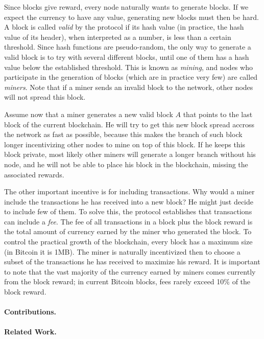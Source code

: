 Since blocks give reward, every node naturally wants to generate blocks. If we expect the currency to have any value, generating new blocks must then be hard. A block is called \emph{valid} by the protocol if its hash value (in practice, the hash value of its header), when interpreted as a number, is less than a certain threshold. Since hash functions are pseudo-random, the only way to generate a valid block is to try with several different blocks, until one of them has a hash value below the established threshold. This is known as \emph{mining}, and nodes who participate in the generation of blocks (which are in practice very few) are called \emph{miners}. Note that if a miner sends an invalid block to the network, other nodes will not spread this block.

Assume now that a miner generates a new valid block $A$ that points to the last block of the current blockchain. He will try to get this new block spread accross the network as fast as possible, because this makes the branch of such block longer incentivizing other nodes to mine on top of this block. If he keeps this block private, most likely other miners will generate a longer branch without his node, and he will not be able to place his block in the blockchain, missing the associated rewards.

The other important incentive is for including transactions. Why would a miner include the transactions he has received into a new block? He might just decide to include few of them. To solve this, the protocol establishes that transactions can include a \emph{fee}. The fee of all transactions in a block plus the block reward is the total amount of currency earned by the miner who generated the block. To control the practical growth of the blockchain, every block has a maximum size (in Bitcoin it is 1MB). The miner is naturally incentivized then to choose a subset of the transactions he has received to maximize his reward. It is important to note that the vast majority of the currency earned by miners comes currently from the block reward; in current Bitcoin blocks, fees rarely exceed 10\% of the block reward.

\paragraph*{\bf Contributions.}

\paragraph*{\bf Related Work.}


